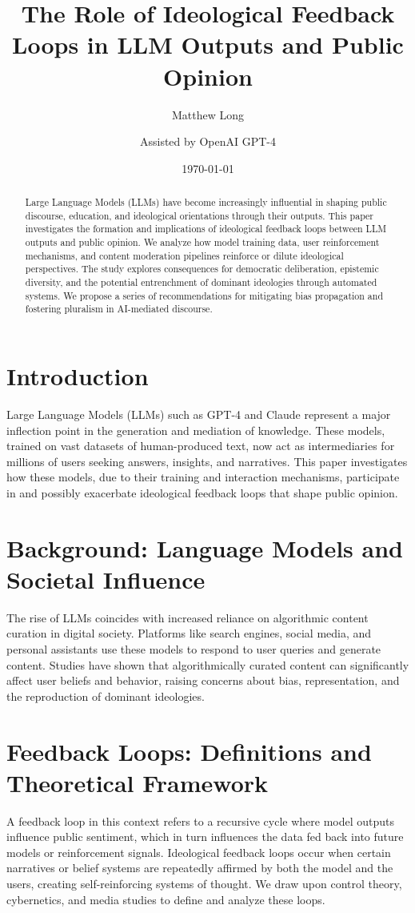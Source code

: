 \documentclass[11pt]{article}
\title{The Role of Ideological Feedback Loops in LLM Outputs and Public Opinion}
\author[1]{Matthew Long}
\author[2]{Assisted by OpenAI GPT-4}
\affil[1]{Yoneda AI Research Lab}
\affil[2]{Language Modeling Division}
\date{\today}
\begin{document}
\maketitle

\begin{abstract}
Large Language Models (LLMs) have become increasingly influential in shaping public discourse, education, and ideological orientations through their outputs. This paper investigates the formation and implications of ideological feedback loops between LLM outputs and public opinion. We analyze how model training data, user reinforcement mechanisms, and content moderation pipelines reinforce or dilute ideological perspectives. The study explores consequences for democratic deliberation, epistemic diversity, and the potential entrenchment of dominant ideologies through automated systems. We propose a series of recommendations for mitigating bias propagation and fostering pluralism in AI-mediated discourse.
\end{abstract}

\tableofcontents

\newpage

\section{Introduction}
Large Language Models (LLMs) such as GPT-4 and Claude represent a major inflection point in the generation and mediation of knowledge. These models, trained on vast datasets of human-produced text, now act as intermediaries for millions of users seeking answers, insights, and narratives. This paper investigates how these models, due to their training and interaction mechanisms, participate in and possibly exacerbate ideological feedback loops that shape public opinion.

\section{Background: Language Models and Societal Influence}
The rise of LLMs coincides with increased reliance on algorithmic content curation in digital society. Platforms like search engines, social media, and personal assistants use these models to respond to user queries and generate content. Studies have shown that algorithmically curated content can significantly affect user beliefs and behavior, raising concerns about bias, representation, and the reproduction of dominant ideologies.

\section{Feedback Loops: Definitions and Theoretical Framework}
A feedback loop in this context refers to a recursive cycle where model outputs influence public sentiment, which in turn influences the data fed back into future models or reinforcement signals. Ideological feedback loops occur when certain narratives or belief systems are repeatedly affirmed by both the model and the users, creating self-reinforcing systems of thought. We draw upon control theory, cybernetics, and media studies to define and analyze these loops.
\end{document}
